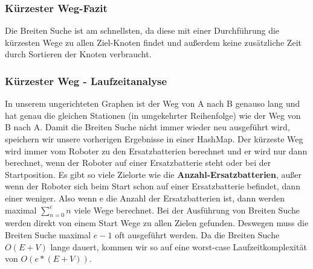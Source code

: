 \documentclass[a4paper,12pt,arial]{scrartcl}
\begin{document}
\subsubsection{Kürzester Weg-Fazit}


Die Breiten Suche ist am schnellsten, da diese mit einer Durchführung die kürzesten Wege zu allen Ziel-Knoten findet und außerdem keine zusätzliche Zeit durch Sortieren der Knoten verbraucht.



\par

\subsubsection{Kürzester Weg - Laufzeitanalyse}
In unserem ungerichteten Graphen ist der Weg von A nach B genauso lang und hat genau die gleichen Stationen (in umgekehrter Reihenfolge) wie der Weg von B nach A.
Damit die Breiten Suche nicht immer wieder neu ausgeführt wird, speichern wir unsere vorherigen Ergebnisse in einer HashMap. 
Der kürzeste Weg wird immer vom Roboter zu den Ersatzbatterien berechnet und er wird nur dann berechnet, wenn der Roboter auf einer Ersatzbatterie steht oder bei der Startposition.
Es gibt so viele Zielorte wie die \textbf{Anzahl-Ersatzbatterien}, außer wenn der Roboter sich beim Start schon auf einer Ersatzbatterie befindet, dann einer weniger.
Also wenn e die Anzahl der Ersatzbatterien ist, dann werden maximal
   \(\sum_{n=0}^{e} n\)  viele Wege berechnet.
Bei der Ausführung von Breiten Suche werden direkt von einem Start Wege zu allen Zielen gefunden. Deswegen muss die Breiten Suche maximal $e-1$ oft ausgeführt werden. Da die Breiten Suche $O(E+V)$ lange dauert, kommen wir so auf eine worst-case Laufzeitkomplexität von $O(e * (E + V))$.
\end{document}
